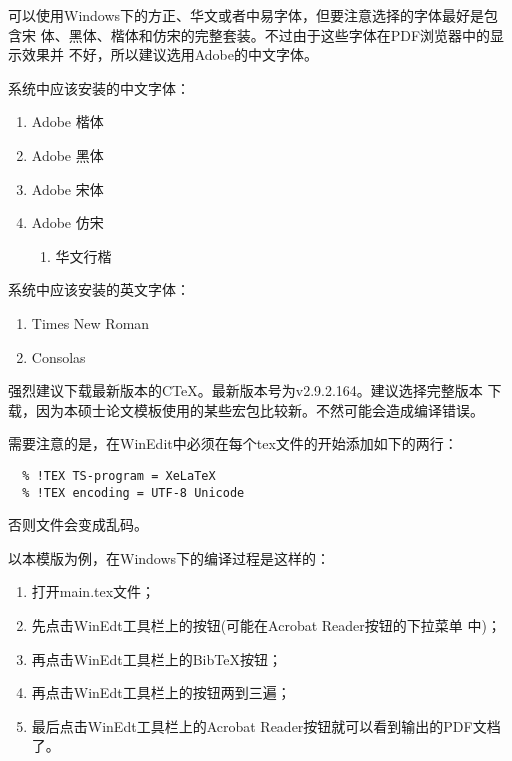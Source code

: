 ﻿%




可以使用Windows下的方正、华文或者中易字体，但要注意选择的字体最好是包含宋
体、黑体、楷体和仿宋的完整套装。不过由于这些字体在PDF浏览器中的显示效果并
不好，所以建议选用Adobe的中文字体。

系统中应该安装的中文字体：
\begin{enumerate}
\item Adobe 楷体
\item Adobe 黑体
\item Adobe 宋体
\item Adobe 仿宋
\begin{enumerate}
\item 华文行楷
\end{enumerate}
\end{enumerate}

系统中应该安装的英文字体：
\begin{enumerate}
\item Times New Roman
\item Consolas
\end{enumerate}


强烈建议下载最新版本的C\TeX{}。最新版本号为v2.9.2.164。建议选择完整版本
下载，因为本硕士论文模板使用的某些宏包比较新。不然可能会造成编译错误。


需要注意的是，在WinEdit中必须在每个tex文件的开始添加如下的两行：
\begin{lstlisting}
  % !TEX TS-program = XeLaTeX
  % !TEX encoding = UTF-8 Unicode
\end{lstlisting}
否则文件会变成乱码。

以本模版为例，在Windows下的编译过程是这样的：
\begin{enumerate}
\item 打开main.tex文件；
\item 先点击WinEdt工具栏上的\XeLaTeX{}按钮(可能在Acrobat Reader按钮的下拉菜单
  中)；
\item 再点击WinEdt工具栏上的Bib\TeX{}按钮；
\item 再点击WinEdt工具栏上的\XeLaTeX{}按钮两到三遍；
\item 最后点击WinEdt工具栏上的Acrobat Reader按钮就可以看到输出的PDF文档了。
\end{enumerate}


